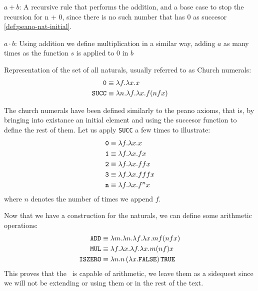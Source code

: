 \documentclass[12pt]{book}
\begin{document}
\begin{itemize*}
\item \underline{$a + b$}: A recursive rule that performs the addition, and a base case to stop the recursion for n + 0, since there is no such number that has $ 0 $ as succesor \ref{def:peano-nat-initial}.
\item \underline{$a \cdot b$}: Using addition we define multiplication in a similar way, adding $a$ as many times as the function $s$ is applied to $0$ in $b$
\end{itemize*}
\begin{definition} Representation of the set of all naturals, usually referred to as Church numerals:
  \label{def:church-naturals}
  \begin{align*}
    \texttt{0} &\equiv \lambda f.\lambda x. x \\
    \texttt{SUCC} &\equiv \lambda n. \lambda f. \lambda x . f ( n f x )
  \end{align*}
\end{definition}
\begin{example}
  The church numerals have been defined similarly to the peano axioms, that is, by bringing into existance an initial element and using the succesor function to define the rest of them. Let us apply \texttt{SUCC} a few times to illustrate:
  \begin{align*}
    \texttt{0} &\equiv \lambda f.\lambda x. x \\
    \texttt{1} &\equiv \lambda f.\lambda x. f x \\
    \texttt{2} &\equiv \lambda f.\lambda x. f f x \\
    \texttt{3} &\equiv \lambda f.\lambda x. f f f x \\
    \texttt{n} &\equiv \lambda f.\lambda x. f ^ n x
  \end{align*}
  where $ n $ denotes the number of times we append $ f $.
\end{example}
Now that we have a construction for the naturals, we can define some arithmetic operations:
\begin{align*}
  \texttt{ADD} &\equiv \lambda m.\lambda n. \lambda f. \lambda x. m f ( n f x) \\
  \texttt{MUL} &\equiv \lambda f.\lambda x. \lambda f. \lambda x. m (n f) x \\
  \texttt{ISZERO} &\equiv \lambda n. n\,(\lambda x.\texttt{FALSE})\,\texttt{TRUE}
\end{align*}
This proves that the \lcalc \ is capable of arithmetic, we leave them as a sidequest since we will not be extending or using them or in the rest of the text.
\end{document}
